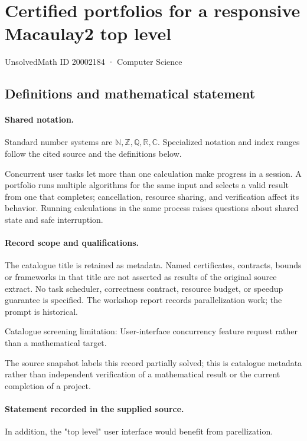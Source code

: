 \documentclass[11pt]{article}
\begin{document}
\setcounter{section}{20002183}
\section{Certified portfolios for a responsive Macaulay2 top level}\label{20002184}
{\small\sffamily UnsolvedMath ID 20002184 · Computer Science}
\subsection{Definitions and mathematical statement}

\paragraph{Shared notation.}Standard number systems are $\mathbb N,\mathbb Z,\mathbb Q,\mathbb R,\mathbb C$. Specialized notation and index ranges follow the cited source and the definitions below.


Concurrent user tasks let more than one calculation make progress in a session. A portfolio runs multiple algorithms for the same input and selects a valid result from one that completes; cancellation, resource sharing, and verification affect its behavior. Running calculations in the same process raises questions about shared state and safe interruption.
\paragraph{Record scope and qualifications.}
The catalogue title is retained as metadata. Named certificates, contracts, bounds or frameworks in that title are not asserted as results of the original source extract.
No task scheduler, correctness contract, resource budget, or speedup guarantee is specified. The workshop report records parallelization work; the prompt is historical.

Catalogue screening limitation: User-interface concurrency feature request rather than a mathematical target.

The source snapshot labels this record partially solved; this is catalogue metadata rather than independent verification of a mathematical result or the current completion of a project.
\paragraph{Statement recorded in the supplied source.}
In addition, the "top level" user interface would benefit from parellization.
\end{document}
